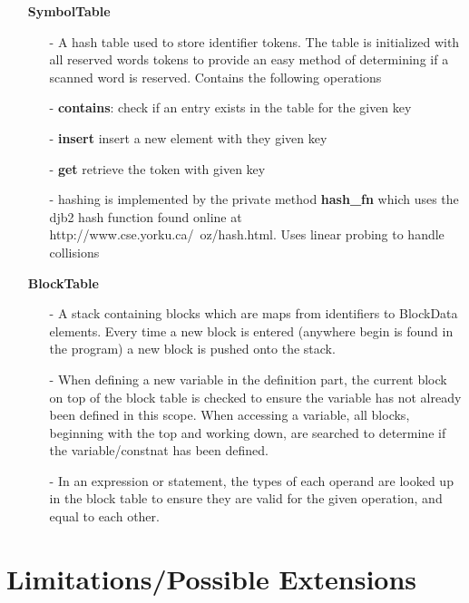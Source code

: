 \documentclass{article}
\begin{document}
\begin{itemize}
        \item[]\textbf{SymbolTable} 
            \begin{itemize}
                \item[-] A hash table used to store identifier tokens. The table is initialized with all reserved words tokens to provide an easy method of determining if a scanned word is reserved. Contains the following operations
                \item[-] \textbf{contains}: check if an entry exists in the table for the given key
                \item[-] \textbf{insert} insert a new element with they given key
                \item[-] \textbf{get} retrieve the token with given key
                \item[-] hashing is implemented by the private method \textbf{hash\_fn} which uses the djb2 hash function found online at http://www.cse.yorku.ca/~oz/hash.html. Uses linear probing to handle collisions
            \end{itemize}

        \item[]\textbf{BlockTable}
            \begin{itemize}
                \item[-] A stack containing blocks which are maps from identifiers to BlockData elements. Every time a new block is entered (anywhere begin is found in the program) a new block is pushed onto the stack. 
                \item[-]When defining a new variable in the definition part, the current block on top of the block table is checked to ensure the variable has not already been defined in this scope. When accessing a variable, all blocks, beginning with the top and working down, are searched to determine if the variable/constnat has been defined.
                \item[-]In an expression or statement, the types of each operand are looked up in the block table to ensure they are valid for the given operation, and equal to each other. 
            \end{itemize}

    \end{itemize}

    \section{Limitations/Possible Extensions}
\end{document}

